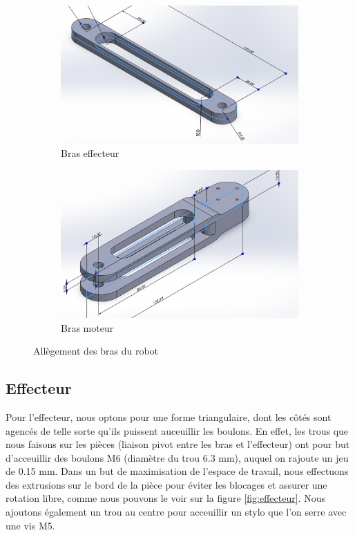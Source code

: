 \documentclass[a4paper, 11pt]{report}
\begin{document}
\begin{figure}[h]
    \centering
    \begin{subfigure}[t]{0.50\textwidth}
        \centering
        \includegraphics[width=\textwidth]{Figures/bras_effecteur.png}
        \caption{Bras effecteur}
    \end{subfigure}
    \hfill
    \begin{subfigure}[t]{0.45\textwidth}
        \centering
        \includegraphics[width=\textwidth]{Figures/bras_moteur.png}
        \caption{Bras moteur}
    \end{subfigure}
    \caption{Allègement des bras du robot}
    \label{fig:bras}
\end{figure}

\subsection{Effecteur}

Pour l'effecteur, nous optons pour une forme triangulaire, dont les côtés sont agencés de telle sorte qu'ils puissent auceuillir les boulons.
En effet, les trous que nous faisons sur les pièces (liaison pivot entre les bras et l'effecteur)
ont pour but d'acceuillir des boulons M6 (diamètre du trou 6.3 mm), auquel on rajoute un jeu de 0.15 mm.
Dans un but de maximisation de l'espace de travail, nous effectuons des extrusions sur le bord de la pièce pour éviter les blocages et assurer une rotation libre,
comme nous pouvons le voir sur la figure \ref{fig:effecteur}. Nous ajoutons également un trou au centre pour acceuillir un stylo que l'on serre avec une vis M5.
\end{document}
